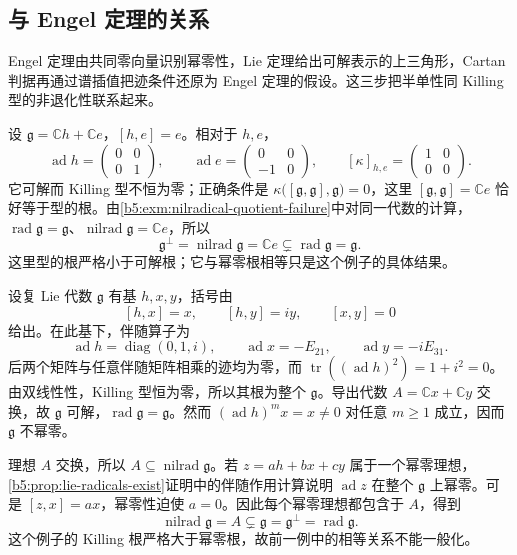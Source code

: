 \subsection{与 Engel 定理的关系}
\label{b5:subsec:1302:03}

Engel 定理由共同零向量识别幂零性，Lie 定理给出可解表示的上三角形，Cartan 判据再通过谱插值把迹条件还原为 Engel 定理的假设。这三步把半单性同 Killing 型的非退化性联系起来。

\begin{example}\label{b5:exm:killing-affine-two}
	设 \(\mathfrak g=\mathbb Ch+\mathbb Ce\)，\([h,e]=e\)。相对于 \(h,e\)，
	\[
		\operatorname{ad}h=\begin{pmatrix}0&0\\0&1\end{pmatrix},
		\qquad
		\operatorname{ad}e=\begin{pmatrix}0&0\\-1&0\end{pmatrix},
		\qquad
		[\kappa]_{h,e}=\begin{pmatrix}1&0\\0&0\end{pmatrix}.
	\]
	它可解而 Killing 型不恒为零；正确条件是 \(\kappa\bigl([\mathfrak g,\mathfrak g],\mathfrak g\bigr)=0\)，这里 \([\mathfrak g,\mathfrak g]=\mathbb Ce\) 恰好等于型的根。由\cref{b5:exm:nilradical-quotient-failure}中对同一代数的计算，\(\operatorname{rad}\mathfrak g=\mathfrak g\)、\(\operatorname{nilrad}\mathfrak g=\mathbb Ce\)，所以
	\[
		\mathfrak g^\perp=\operatorname{nilrad}\mathfrak g =\mathbb Ce\subsetneq\operatorname{rad}\mathfrak g=\mathfrak g.
	\]
	这里型的根严格小于可解根；它与幂零根相等只是这个例子的具体结果。
\end{example}

\begin{example}\label{b5:exm:zero-killing-nonnilpotent}
	设复 Lie 代数 \(\mathfrak g\) 有基 \(h,x,y\)，括号由
	\[
		[h,x]=x,\qquad[h,y]=iy,\qquad[x,y]=0
	\]
	给出。在此基下，伴随算子为
	\[
		\operatorname{ad}h=\operatorname{diag}(0,1,i),\qquad \operatorname{ad}x=-E_{21},\qquad \operatorname{ad}y=-iE_{31}.
	\]
	后两个矩阵与任意伴随矩阵相乘的迹均为零，而 \(\operatorname{tr}((\operatorname{ad}h)^2)=1+i^2=0\)。由双线性性，Killing 型恒为零，所以其根为整个 \(\mathfrak g\)。导出代数 \(A=\mathbb Cx+\mathbb Cy\) 交换，故 \(\mathfrak g\) 可解，\(\operatorname{rad}\mathfrak g=\mathfrak g\)。然而 \((\operatorname{ad}h)^m x=x\ne0\) 对任意 \(m\ge1\) 成立，因而 \(\mathfrak g\) 不幂零。

	理想 \(A\) 交换，所以 \(A\subseteq\operatorname{nilrad}\mathfrak g\)。若 \(z=ah+bx+cy\) 属于一个幂零理想，\cref{b5:prop:lie-radicals-exist}证明中的伴随作用计算说明 \(\operatorname{ad}z\) 在整个 \(\mathfrak g\) 上幂零。可是 \([z,x]=ax\)，幂零性迫使 \(a=0\)。因此每个幂零理想都包含于 \(A\)，得到
	\[
		\operatorname{nilrad}\mathfrak g=A\subsetneq\mathfrak g =\mathfrak g^\perp=\operatorname{rad}\mathfrak g.
	\]
	这个例子的 Killing 根严格大于幂零根，故前一例中的相等关系不能一般化。
\end{example}

